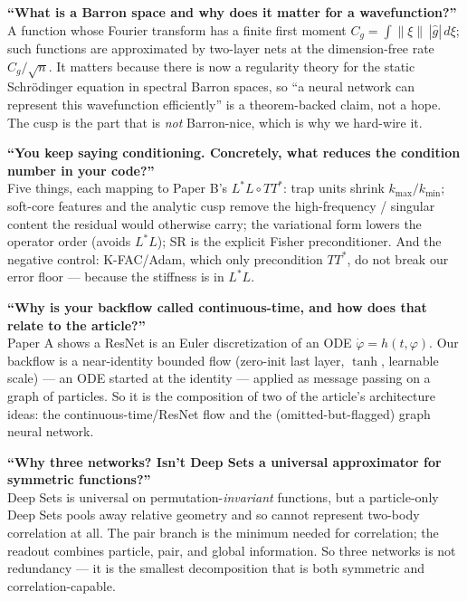\documentclass[11pt]{article}
\begin{document}
\begin{anticipate}
\textbf{``What is a Barron space and why does it matter for a wavefunction?''}\\
A function whose Fourier transform has a finite first moment $C_g=\int\|\xi\|\,|\hat g|\,d\xi$; such
functions are approximated by two-layer nets at the dimension-free rate $C_g/\sqrt n$. It matters
because there is now a regularity theory for the static Schr\"odinger equation in spectral Barron
spaces, so ``a neural network can represent this wavefunction efficiently'' is a theorem-backed claim,
not a hope. The cusp is the part that is \emph{not} Barron-nice, which is why we hard-wire it.
\end{anticipate}

\begin{anticipate}
\textbf{``You keep saying conditioning. Concretely, what reduces the condition number in your code?''}\\
Five things, each mapping to Paper B's $L^\ast L\circ TT^\ast$: trap units shrink $k_{\max}/k_{\min}$;
soft-core features and the analytic cusp remove the high-frequency / singular content the residual
would otherwise carry; the variational form lowers the operator order (avoids $L^\ast L$); SR is the
explicit Fisher preconditioner. And the negative control: K-FAC/Adam, which only precondition $TT^\ast$,
do not break our error floor --- because the stiffness is in $L^\ast L$.
\end{anticipate}

\begin{anticipate}
\textbf{``Why is your backflow called continuous-time, and how does that relate to the article?''}\\
Paper A shows a ResNet is an Euler discretization of an ODE $\dot\varphi=h(t,\varphi)$. Our backflow
is a near-identity bounded flow (zero-init last layer, $\tanh$, learnable scale) --- an ODE started at
the identity --- applied as message passing on a graph of particles. So it is the composition of two
of the article's architecture ideas: the continuous-time/ResNet flow and the (omitted-but-flagged)
graph neural network.
\end{anticipate}

\begin{anticipate}
\textbf{``Why three networks? Isn't Deep Sets a universal approximator for symmetric functions?''}\\
Deep Sets is universal on permutation-\emph{invariant} functions, but a particle-only Deep Sets pools
away relative geometry and so cannot represent two-body correlation at all. The pair branch is the
minimum needed for correlation; the readout combines particle, pair, and global information. So three
networks is not redundancy --- it is the smallest decomposition that is both symmetric and
correlation-capable.
\end{anticipate}
\end{document}

